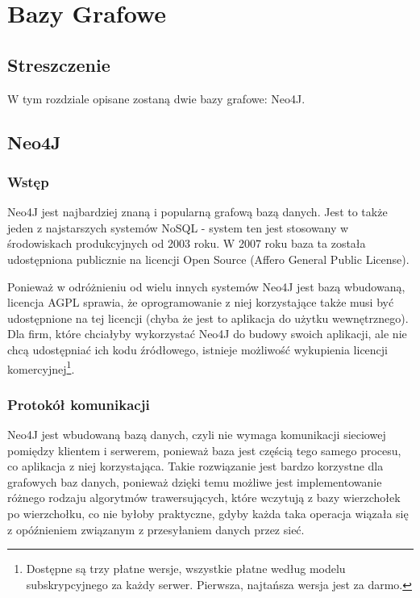 \chapter{Bazy Grafowe}

\section*{Streszczenie}
W tym rozdziale opisane zostaną dwie bazy grafowe: Neo4J.

\section{Neo4J}
\label{sec:neo4j}

\subsection*{Wstęp}

Neo4J jest najbardziej znaną i popularną grafową bazą danych.
Jest to także jeden z najstarszych systemów NoSQL - system ten jest stosowany w środowiskach produkcyjnych od 2003 roku.
W 2007 roku baza ta została udostępniona publicznie na licencji Open Source (Affero General Public License).

Ponieważ w odróżnieniu od wielu innych systemów Neo4J jest bazą wbudowaną, licencja AGPL sprawia, że oprogramowanie z niej korzystające także musi być udostępnione na tej licencji (chyba że jest to aplikacja do użytku wewnętrznego).
Dla firm, które chciałyby wykorzystać Neo4J do budowy swoich aplikacji, ale nie chcą udostępniać ich kodu źródłowego, istnieje możliwość wykupienia licencji komercyjnej\footnote{Dostępne są trzy płatne wersje, wszystkie płatne według modelu subskrypcyjnego za każdy serwer. Pierwsza, najtańsza wersja jest za darmo.}.

\subsection*{Protokół komunikacji}

Neo4J jest wbudowaną bazą danych, czyli nie wymaga komunikacji sieciowej pomiędzy klientem i serwerem, ponieważ baza jest częścią tego samego procesu, co aplikacja z niej korzystająca.
Takie rozwiązanie jest bardzo korzystne dla grafowych baz danych, ponieważ dzięki temu możliwe jest implementowanie różnego rodzaju algorytmów trawersujących, które wczytują z bazy wierzchołek po wierzchołku, co nie byłoby praktyczne, gdyby każda taka operacja wiązała się z opóźnieniem związanym z przesyłaniem danych przez sieć.

